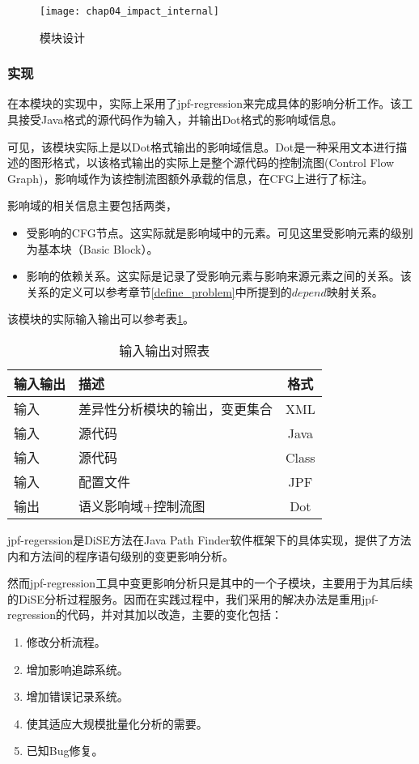 \begin{figure}[H]
	\centering
	\texttt{[image: chap04\_impact\_internal]}
	\caption {模块设计}
	\label {des_impact}	
\end{figure}

\subsubsection{实现}


在本模块的实现中，实际上采用了jpf-regression来完成具体的影响分析工作。该工具接受Java格式的源代码作为输入，并输出Dot格式的影响域信息。

可见，该模块实际上是以Dot格式输出的影响域信息。Dot是一种采用文本进行描述的图形格式，以该格式输出的实际上是整个源代码的控制流图(Control Flow Graph)，影响域作为该控制流图额外承载的信息，在CFG上进行了标注。

影响域的相关信息主要包括两类，
\begin{itemize}
	\item 受影响的CFG节点。这实际就是影响域中的元素。可见这里受影响元素的级别为基本块（Basic Block）。
	\item 影响的依赖关系。这实际是记录了受影响元素与影响来源元素之间的关系。该关系的定义可以参考章节\ref {define_problem}中所提到的$depend$映射关系。
\end{itemize}

该模块的实际输入输出可以参考表\ref {impact_io2}。

\begin{table}[H]
	\caption{输入输出对照表}
	\label{impact_io2}
	\centering
	\begin{tabular}{llc}
		\toprule[1.5pt]
		{\heiti 输入输出} & {\heiti 描述} & {\heiti 格式} \\\midrule[1pt]
		输入 & 差异性分析模块的输出，变更集合 & XML \\
		输入 & 源代码 & Java \\
		输入 & 源代码 & Class \\
		输入 & 配置文件 & JPF \\
		输出 & 语义影响域+控制流图 & Dot \\
		\bottomrule[1.5pt]
	\end{tabular}
\end{table}

jpf-regerssion是DiSE方法在Java Path Finder软件框架下的具体实现，提供了方法内和方法间的程序语句级别的变更影响分析。

然而jpf-regression工具中变更影响分析只是其中的一个子模块，主要用于为其后续的DiSE分析过程服务。因而在实践过程中，我们采用的解决办法是重用jpf-regression的代码，并对其加以改造，主要的变化包括：
\begin{enumerate}
	\item 修改分析流程。
	\item 增加影响追踪系统。
	\item 增加错误记录系统。
	\item 使其适应大规模批量化分析的需要。
	\item 已知Bug修复。
\end{enumerate}

